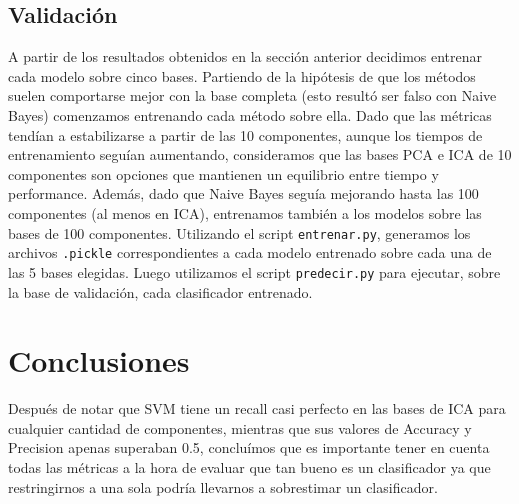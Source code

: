 \documentclass[10pt, a4paper]{article}
\begin{document}
\subsection{Validación}

A partir de los resultados obtenidos en la sección anterior decidimos entrenar cada modelo sobre cinco bases. Partiendo de la hipótesis de que los métodos suelen comportarse mejor con la base completa (esto resultó ser falso con Naive Bayes) comenzamos entrenando cada método sobre ella. Dado que las métricas tendían a estabilizarse a partir de las 10 componentes, aunque los tiempos de entrenamiento seguían aumentando, consideramos que las bases PCA e ICA de 10 componentes son opciones que mantienen un equilibrio entre tiempo y performance. Además, dado que Naive Bayes seguía mejorando hasta las 100 componentes (al menos en ICA), entrenamos también a los modelos sobre las bases de 100 componentes. Utilizando el script \texttt{entrenar.py}, generamos los archivos \texttt{.pickle} correspondientes a cada modelo entrenado sobre cada una de las 5 bases elegidas. Luego utilizamos el script \texttt{predecir.py} para ejecutar, sobre la base de validación, cada clasificador entrenado.

\section{Conclusiones}

Después de notar que SVM tiene un recall casi perfecto en las bases de ICA para cualquier cantidad de componentes,
mientras que sus valores de Accuracy y Precision apenas superaban 0.5, concluímos que es importante tener en cuenta todas las métricas a 
la hora de evaluar que tan bueno es un clasificador ya que restringirnos a una sola podría llevarnos a sobrestimar un clasificador.
\end{document}
